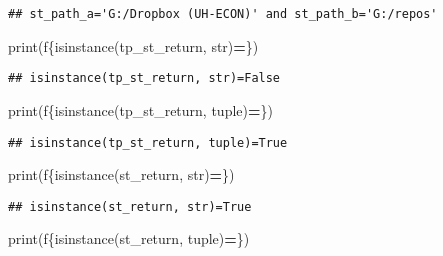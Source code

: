 \documentclass[
]{book}
\newenvironment{Shaded}{\begin{snugshade}}{\end{snugshade}}
\newcommand{\BuiltInTok}[1]{#1}
\newcommand{\NormalTok}[1]{#1}
\newcommand{\OperatorTok}[1]{\textcolor[rgb]{0.81,0.36,0.00}{\textbf{#1}}}
\newcommand{\SpecialCharTok}[1]{\textcolor[rgb]{0.00,0.00,0.00}{#1}}
\newcommand{\SpecialStringTok}[1]{\textcolor[rgb]{0.31,0.60,0.02}{#1}}
\begin{document}
\begin{verbatim}
## st_path_a='G:/Dropbox (UH-ECON)' and st_path_b='G:/repos'
\end{verbatim}

\begin{Shaded}
\begin{Highlighting}[]
\BuiltInTok{print}\NormalTok{(}\SpecialStringTok{f\textquotesingle{}}\SpecialCharTok{\{}\BuiltInTok{isinstance}\NormalTok{(tp\_st\_return, }\BuiltInTok{str}\NormalTok{)}\OperatorTok{=}\SpecialCharTok{\}}\SpecialStringTok{\textquotesingle{}}\NormalTok{)}
\end{Highlighting}
\end{Shaded}

\begin{verbatim}
## isinstance(tp_st_return, str)=False
\end{verbatim}

\begin{Shaded}
\begin{Highlighting}[]
\BuiltInTok{print}\NormalTok{(}\SpecialStringTok{f\textquotesingle{}}\SpecialCharTok{\{}\BuiltInTok{isinstance}\NormalTok{(tp\_st\_return, }\BuiltInTok{tuple}\NormalTok{)}\OperatorTok{=}\SpecialCharTok{\}}\SpecialStringTok{\textquotesingle{}}\NormalTok{)}
\end{Highlighting}
\end{Shaded}

\begin{verbatim}
## isinstance(tp_st_return, tuple)=True
\end{verbatim}

\begin{Shaded}
\begin{Highlighting}[]
\BuiltInTok{print}\NormalTok{(}\SpecialStringTok{f\textquotesingle{}}\SpecialCharTok{\{}\BuiltInTok{isinstance}\NormalTok{(st\_return, }\BuiltInTok{str}\NormalTok{)}\OperatorTok{=}\SpecialCharTok{\}}\SpecialStringTok{\textquotesingle{}}\NormalTok{)}
\end{Highlighting}
\end{Shaded}

\begin{verbatim}
## isinstance(st_return, str)=True
\end{verbatim}

\begin{Shaded}
\begin{Highlighting}[]
\BuiltInTok{print}\NormalTok{(}\SpecialStringTok{f\textquotesingle{}}\SpecialCharTok{\{}\BuiltInTok{isinstance}\NormalTok{(st\_return, }\BuiltInTok{tuple}\NormalTok{)}\OperatorTok{=}\SpecialCharTok{\}}\SpecialStringTok{\textquotesingle{}}\NormalTok{)}
\end{Highlighting}
\end{Shaded}
\end{document}
